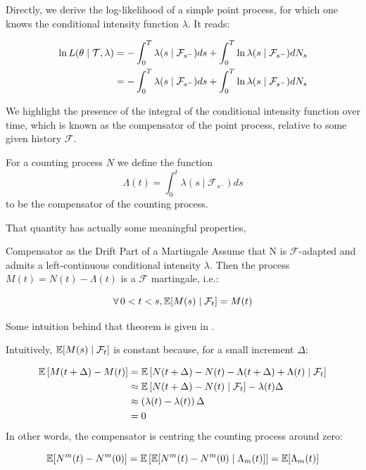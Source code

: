 \documentclass[11pt]{book}
\begin{document}
Directly, we derive the log-likelihood of a simple point process, for which one knows the conditional intensity function $\lambda$. It reads:

\begin{align}
\ln L( \theta \mid \mathcal{T}, \lambda ) &= - \int_0^T  \lambda(s \mid \mathcal F_{s^-}) ds + \int_0^T  \ln \lambda(s \mid \mathcal F_{s^-} )d N_s \notag \\
&=  - \int_0^T \lambda(s \mid \mathcal F_{s^-}) ds + \int_0^T  \ln \lambda(s \mid \mathcal F_{s^-} )d N_s 
\label{eq:intensity_lambda}
\end{align}

We highlight the presence of the integral of the conditional intensity function over time, which is known as the compensator of the point process, relative to some given history $\mathcal F$. 


\begin{definition}[Compensator]
\label{def:compensator}
For a counting process $N$ we define the function $$\Lambda(t) = \int_0^t \lambda (s \mid \mathcal F_{s^-} ) ds $$  to be the compensator of the counting process.
\end{definition}

That quantity has actually some meaningful properties,

\begin{theoreme}{Compensator as the Drift Part of a Martingale}
Assume that N is $\mathcal F$-adapted and admits a left-continuous conditional intensity $\lambda$. Then the process $M(t) = N(t) - \Lambda (t)$ is a $\mathcal F$ martingale, i.e.:

$$\forall 0 < t < s, \E [ M(s) \mid \mathcal F_t ] = M(t)$$
\end{theoreme}


\begin{demo}{}{}
Some intuition behind that theorem is given in \cite{daley}.

Intuitively, $\mathbb E[M(s) \mid \mathcal F_t]$ is constant because, for a small increment $\Delta$:

\begin{align*}
\mathbb E \left [ M( t + \Delta ) - M(t) \right ] &= \mathbb E \left[ N(t+ \Delta ) - N(t) - \Lambda( t + \Delta) + \Lambda(t) \mid \mathcal F_t \right ] \\
&\approx   \mathbb E \left[ N(t+ \Delta ) - N(t) \mid \mathcal F_t \right ] - \lambda(t) \Delta  \\
&\approx \left ( \lambda(t) - \lambda(t) \right  ) \Delta  \\
&= 0 
\end{align*}
In other words, the compensator is centring the counting process around zero: 

$$\mathbb E [ N^m (t) - N^m (0) ] = \mathbb E  \left  [ \mathbb E [ N^m (t) - N^m (0) \mid \Lambda_m(t) ]  \right ] = \mathbb E [ \Lambda_m (t) ] $$

\end{demo}
\end{document}
